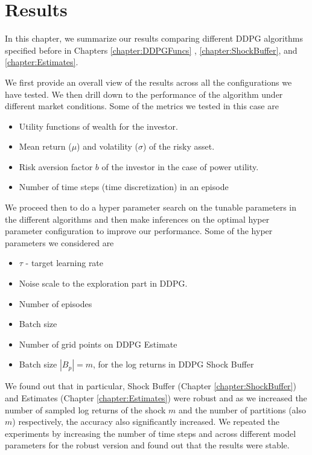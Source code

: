 \chapter{Results}\label{chapter:Results}

In this chapter, we summarize our results comparing different DDPG algorithms specified before in Chapters \ref{chapter:DDPGFuncs} , \ref{chapter:ShockBuffer}, and \ref{chapter:Estimates}.

We first provide an overall view of the results across all the configurations we have tested. We then drill down to the performance of the algorithm under different market conditions. Some of the metrics we tested in this case are
\begin{itemize}
    \item Utility functions of wealth for the investor.
    \item Mean return ($\mu$) and volatility ($\sigma$) of the risky asset.
    \item Risk aversion factor $b$ of the investor in the case of power utility.
    \item Number of time steps (time discretization) in an episode
\end{itemize}

We proceed then to do a hyper parameter search on the tunable parameters in the different algorithms and then make inferences on the optimal hyper parameter configuration to improve our performance. Some of the hyper parameters we considered are
\begin{itemize}
\item $\tau$ -  target learning rate 
\item Noise scale to the exploration part in DDPG.
\item Number of episodes
\item Batch size
\item Number of grid points on DDPG Estimate 
\item Batch size $|B_p|=m$, for the log  returns in DDPG Shock Buffer 
\end{itemize}

We found out that in particular, Shock Buffer (Chapter \ref{chapter:ShockBuffer}) and Estimates (Chapter \ref{chapter:Estimates}) were robust and as we increased the number of sampled log returns of the shock $m$ and the number of partitions (also $m$) respectively, the accuracy also significantly increased. We repeated the experiments by increasing the number of time steps and across different model parameters for the robust version and found out that the results were stable.


